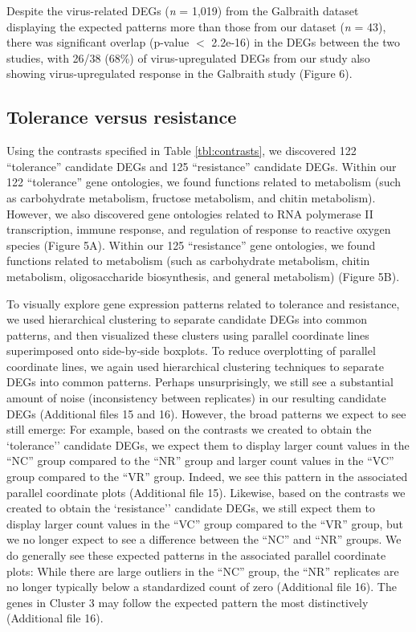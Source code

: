 \documentclass{bmcart}
\begin{document}
\begin{linenumbers}
\begin{doublespacing}
Despite the virus-related DEGs (\textit{n} = 1,019) from the Galbraith dataset displaying the expected patterns more than those from our dataset (\textit{n} = 43), there was significant overlap (p-value $<$ 2.2e-16) in the DEGs between the two studies, with 26/38 (68\%) of virus-upregulated DEGs from our study also showing virus-upregulated response in the Galbraith study (Figure 6).

\subsection*{Tolerance versus resistance}

Using the contrasts specified in Table \ref{tbl:contrasts}, we discovered 122 ``tolerance'' candidate DEGs and 125 ``resistance'' candidate DEGs. Within our 122 ``tolerance'' gene ontologies, we found functions related to metabolism (such as carbohydrate metabolism, fructose metabolism, and chitin metabolism). However, we also discovered gene ontologies related to RNA polymerase II transcription, immune response, and regulation of response to reactive oxygen species (Figure 5A). Within our 125 ``resistance'' gene ontologies, we found functions related to metabolism (such as carbohydrate metabolism, chitin metabolism, oligosaccharide biosynthesis, and general metabolism) (Figure 5B).

To visually explore gene expression patterns related to tolerance and resistance, we used hierarchical clustering to separate candidate DEGs into common patterns, and then visualized these clusters using parallel coordinate lines superimposed onto side-by-side boxplots. To reduce overplotting of parallel coordinate lines, we again used hierarchical clustering techniques to separate DEGs into common patterns. Perhaps unsurprisingly, we still see a substantial amount of noise (inconsistency between replicates) in our resulting candidate DEGs (Additional files 15 and 16). However, the broad patterns we expect to see still emerge: For example, based on the contrasts we created to obtain the `tolerance'' candidate DEGs, we expect them to display larger count values in the ``NC'' group compared to the ``NR'' group and larger count values in the ``VC'' group compared to the ``VR'' group. Indeed, we see this pattern in the associated parallel coordinate plots (Additional file 15). Likewise, based on the contrasts we created to obtain the `resistance'' candidate DEGs, we still expect them to display larger count values in the ``VC'' group compared to the ``VR'' group, but we no longer expect to see a difference between the ``NC'' and ``NR'' groups. We do generally see these expected patterns in the associated parallel coordinate plots: While there are large outliers in the ``NC'' group, the ``NR'' replicates are no longer typically below a standardized count of zero (Additional file 16). The genes in Cluster 3 may follow the expected pattern the most distinctively (Additional file 16).


\end{doublespacing}
\end{linenumbers}
\end{document}

